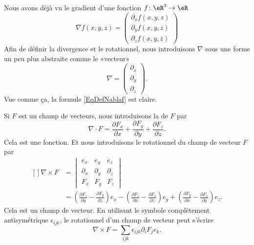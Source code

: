 Nous avons déjà vu le gradient d'une fonction \( f\colon \eR^3\to \eR\)
\begin{equation}        \label{EqDefNablaf}
	\nabla f(x,y,z)=\begin{pmatrix}
		\partial_xf(x,y,z) \\
		\partial_yf(x,y,z) \\
		\partial_zf(x,y,z)
	\end{pmatrix}
\end{equation}
Afin de définir la divergence et le rotationnel, nous introduisons \( \nabla\) sous une forme un peu plus abstraite comme le «vecteur»
\begin{equation}
	\nabla=\begin{pmatrix}
		\partial_x \\
		\partial_y \\
		\partial_z
	\end{pmatrix}.
\end{equation}
Vue comme ça, la formule \eqref{EqDefNablaf} est claire.

Si \( F\) est un champ de vecteurs, nous introduisons la  de \( F\) par
\begin{equation}
	\nabla\cdot F=\frac{ \partial F_x }{ \partial x }+\frac{ \partial F_y }{ \partial y }+\frac{ \partial F_z }{ \partial z }.
\end{equation}
Cela est une fonction. Et nous introduisons le rotationnel du champ de vecteur \( F\) par
\begin{equation}
	\begin{aligned}[]
		\nabla\times F & =\begin{vmatrix}
			                  e_x        & e_y        & e_z        \\
			                  \partial_x & \partial_y & \partial_z \\
			                  F_x        & F_y        & F_z
		                  \end{vmatrix} \\
		               & =
		\left( \frac{ \partial F_z }{ \partial y }-\frac{ \partial F_y }{ \partial z } \right)e_x
		-\left( \frac{ \partial F_z }{ \partial x }-\frac{ \partial F_x }{ \partial z } \right)e_y
		+\left( \frac{ \partial F_y }{ \partial x }-\frac{ \partial F_x }{ \partial y } \right)e_z.
	\end{aligned}
\end{equation}
Cela est un champ de vecteur. En utilisant le symbole complètement antisymétrique \( \epsilon_{ijk}\), le rotationnel d'un champ de vecteur peut s'écrire
\begin{equation}
	\nabla\times F=\sum_{ijk}\epsilon_{ijk}\partial_i F_j e_k.
\end{equation}

